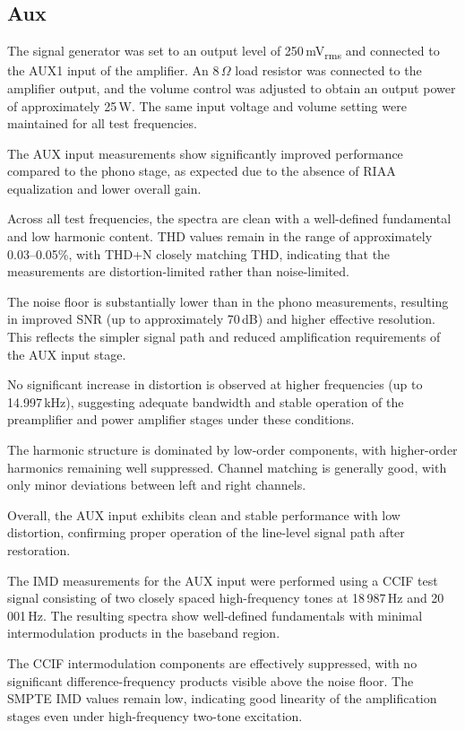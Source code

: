 \documentclass[]{article}
\begin{document}
\subsection{Aux}

The signal generator was set to an output level of 250\,mV\textsubscript{rms} and connected to the AUX1 input of the amplifier. An 8\,\(\Omega\) load resistor was connected to the amplifier output, and the volume control was adjusted to obtain an output power of approximately 25\,W. The same input voltage and volume setting were maintained for all test frequencies.

The AUX input measurements show significantly improved performance compared to the phono stage, as expected due to the absence of RIAA equalization and lower overall gain.

Across all test frequencies, the spectra are clean with a well-defined fundamental and low harmonic content. THD values remain in the range of approximately 0.03--0.05\%, with THD+N closely matching THD, indicating that the measurements are distortion-limited rather than noise-limited.

The noise floor is substantially lower than in the phono measurements, resulting in improved SNR (up to approximately 70\,dB) and higher effective resolution. This reflects the simpler signal path and reduced amplification requirements of the AUX input stage.

No significant increase in distortion is observed at higher frequencies (up to 14.997\,kHz), suggesting adequate bandwidth and stable operation of the preamplifier and power amplifier stages under these conditions.

The harmonic structure is dominated by low-order components, with higher-order harmonics remaining well suppressed. Channel matching is generally good, with only minor deviations between left and right channels.

Overall, the AUX input exhibits clean and stable performance with low distortion, confirming proper operation of the line-level signal path after restoration.

The IMD measurements for the AUX input were performed using a CCIF test signal consisting of two closely spaced high-frequency tones at 18\,987\,Hz and 20\,001\,Hz. The resulting spectra show well-defined fundamentals with minimal intermodulation products in the baseband region.

The CCIF intermodulation components are effectively suppressed, with no significant difference-frequency products visible above the noise floor. The SMPTE IMD values remain low, indicating good linearity of the amplification stages even under high-frequency two-tone excitation.
\end{document}
